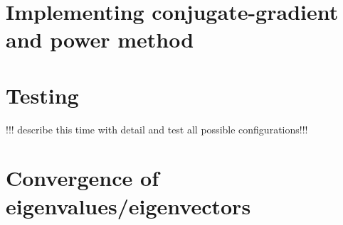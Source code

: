 \documentclass[11pt, letterpaper, onecolumn]{article}
\begin{document}
	
	
	
	\section{Implementing conjugate-gradient and power method}
	
	
	
	
	\section{Testing}
	!!! describe this time with detail and test all possible configurations!!!
	
	
	
	\section{Convergence of eigenvalues/eigenvectors}
\end{document}
